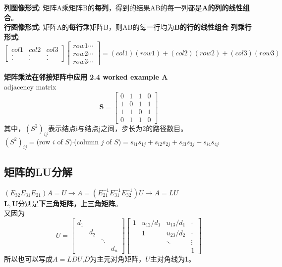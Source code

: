 \documentclass[UTF8]{article}
\begin{document}
    \textbf{列图像形式}: 矩阵A乘矩阵B的\textbf{每列}，得到的结果AB的每一列都是\textbf{A的列的线性组合}。\\
    \textbf{行图像形式}: 矩阵A的\textbf{每行}乘矩阵B，则AB的每一行均为\textbf{B的行的线性组合}
    \textbf{列乘行形式}:
    $$
    \begin{bmatrix}
        col1 & col2 & col3 \\ . & . & . \\ . & . & .
    \end{bmatrix}
    \begin{bmatrix}
        row1 \cdots \\
        row2 \cdots \\
        row3 \cdots 
    \end{bmatrix}
    = (col1)(row1) + (col2)(row2) + (col3)(row3)
    $$

    \textbf{矩阵乘法在邻接矩阵中应用 2.4 worked example A} \\
    adjacency matrix
    $$
    \bm{S} =
    \begin{bmatrix}
        0 & 1 & 1 & 0\\
        1 & 0 & 1 & 1\\
        1 & 1 & 0 & 1\\
        0 & 1 & 1 & 0
    \end{bmatrix}
    $$
    其中，$(S^2)_{ij}$表示结点i与结点j之间，步长为2的路径数目。\\
    $(S^2)_{ij}=$(row $i$ of $S$)$\cdot$(column $j$ of $S$)$=s_{i1}s_{1j}+s_{i2}s_{2j}+s_{i3}s_{3j}+s_{i4}s_{4j}$

    \subsection{矩阵的LU分解}
    $(E_{32}E_{31}E_{21})A=U \rightarrow A = (E_{21}^{-1}E_{31}^{-1}E_{32}^{-1})U \rightarrow A=LU$
    \\
    $\bm{L, U}$分别是\textbf{下三角矩阵，上三角矩阵}。
    \\
    又因为
    $$
    U=
    \begin{bmatrix}
        d_1 & & &\\
         & d_2 & &\\
         &  & \ddots & \\
         &  & & d_n
    \end{bmatrix}
    \begin{bmatrix}
        1 & u_{12}/d_{1} & u_{13}/d_{1} & \cdot \\
          & 1 & u_{23}/d_2 & \cdot \\
          &   & \ddots & \vdots \\
          &   &   & 1
    \end{bmatrix}
    $$
    所以也可以写成$A=LDU$,$D$为主元对角矩阵，$U$主对角线为1。
\end{document}
